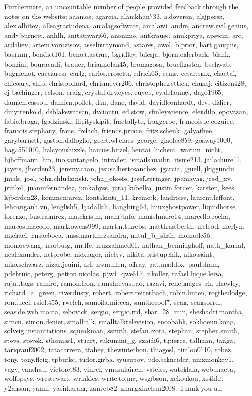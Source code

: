 \documentclass[a4paper,10pt,twoside]{book}
\begin{document}
Furthermore, an uncountable number of people provided feedback through the notes on the website:
aaamos,
agarcia,
alamkhan733,
aldeveron,
alejperez,
alex.albitov,
alleagrastudena,
amalagsoftware,
amalawi,
andre,
andrew.evil.genius,
andy.burnett,
anhlh,
anitatiwari66,
anonimo,
antkrause,
anukpriya,
apstein,
arc,
ardaliev,
artem.voroztsov,
asselinraymond,
astares,
awol,
b.prior,
bart.gauquie,
basilmir,
bendict101,
benoit.astruc,
bgridley,
bilesja,
bjorn.eiderback,
blank,
bonzini,
bouraqadi,
brauer,
briannolan45,
bromagosa,
bruefkasten,
bschwab,
bugmenot,
cacciaresi,
carlg,
carlos.crosetti,
cdrick65,
cems,
cesar.smx,
chaetal,
chicoary,
chip,
chris.pollard,
chrismeyer206,
christophe.rettien,
chunsj,
citizen428,
cj-bachinger,
colson,
craig,
crystal.dry.eyes,
cuyeu,
cy.delaunay,
dago1965,
damien.cassou,
damien.pollet,
dan,
danc,
david,
davidleonhardt,
dev,
didier,
dmytrenko.d,
dsblakewatson,
dvciontu,
ed.stow,
efinleyscience,
elendilo,
epovazan,
fabio.braga,
fgadzinski,
flipityskipit,
fractallyte,
fraggerbe,
francois.le.coguiec,
francois.stephany,
frans,
frelach,
friends.prince,
fritz.schenk,
galyathee,
garybarnett,
gaston.dalloglio,
geert.wl.claes,
george,
ginolee859,
goaway1000,
haga551010,
halcyonshizzle,
hannes.hirzel,
hentai,
hichem\_warum\_nicht,
hjhoffmann,
hm,
ino.santangelo,
intrader,
ismailshuaibu,
itsme213,
jailachure11,
jayers,
jborden23,
jeremy.chan,
jesusalbertosanchez,
jgarcia,
jguell,
jkiggundu,
jnials,
joel,
john.chludzinski,
john\_okeefe,
josef.springer,
jpamayag,
jred\_xv,
jrinkel,
juanmfernandez,
junkabyss,
juraj.kubelka,
justin.forder,
karsten,
kees,
kjborden23,
kommentaren,
kontakinti\_11,
kremerk,
landriese,
laurent.laffont,
lehoanganh.vn,
lenglish5,
lgadallah,
liangbing64,
linuxghostpower,
liquidhorse,
lorenzo,
luis.ramirez,
ma.chris.m,
mani7info,
manishmore14,
marcello.rocha,
marcos.macedo,
mark.owens999,
martin.t.krebs,
matthias.berth,
mcleod,
merlyn,
michael,
misaeboca,
miss.martinezsandra,
mitul\_b\_shah,
momode56,
momoewang,
morbusg,
mriffe,
muzzahmed01,
nathan\_benninghoff,
nath\_kamal,
ncalexander,
netprobe,
nick.ager,
nielvv,
nikita.pristupchik,
niko.saint,
niko.schwarz,
nizar.jouini,
nrf,
nwmullen,
offray,
pat.maddox,
paulpham,
pdebruic,
peterg,
petton.nicolas,
pjw1,
qwe517,
r.koller,
rafael.luque.leiva,
rajat.tags,
ramiro,
ramon.leon,
ramshreyas.rao,
razavi,
rene.mages,
rh,
rhawley,
richard\_a\_green,
riverdusty,
robert,
robert.reitenbach,
robin.luiten,
rogthedodge,
ron.fucci,
rsiel.455,
rwelch,
samoila.mircea,
samthecool7,
sean,
seansorrel,
seaside.web.macta,
sebovick,
sergio,
sergio.rrd,
shar\_28\_min,
sheshadri.mantha,
simon,
simon.denier,
smalltalk,
smalltalktelevision,
snoobabk,
sokhoeun.kong,
solveig.instantiations,
squeakman,
ssmith,
stefan.izota,
stephan,
stephen.smith,
steve,
stevek,
sthomas1,
stuart,
sukumini\_g,
szaidi6,
t.pierce,
tallman,
tanga,
tariqrauf2002,
tatacarrera,
tfahey,
thewinterlion,
thiagosl,
timloo0710,
tobez,
tony,
tony.fleig,
tpburke,
tudor.girba,
tyusupov,
udo.schneider,
unixmonkey1,
vagy,
vanchau,
victorct83,
vinref,
vmusulainen,
vsteiss,
watchlala,
web.macta,
wolfopsys,
wrcstewart,
wrinkles,
write.to.me,
wsgibson,
xekoukou,
xs4hkr,
y2ahsan,
yanni,
yasirkaram,
zanveb82,
zhangxinchun2008.
Thank you all.
\end{document}
